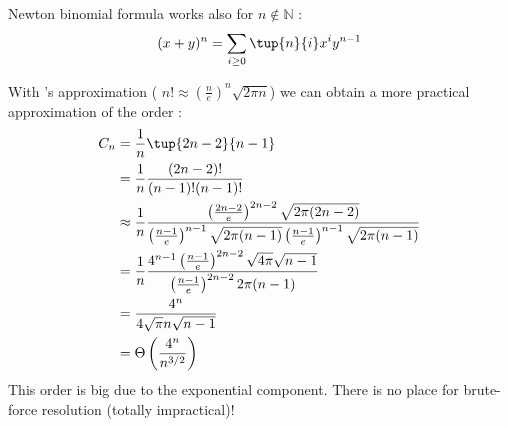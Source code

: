 \begin{theorem} \label{cm4:newton}
Newton binomial formula works also for $n\not\in \mathbb{N}$ : $$(x+y)^n = \sum_{i\geq 0} \tup{n}{i} x^i y^{n-1}$$
\end{theorem}

With 's approximation (
$n! \approx \left(\frac{n}{e}\right)^n \sqrt{2\pi n}$) we can obtain a more practical approximation of the order : 
\begin{align*}
C_n &= \frac{1}{n}\tup{2n-2}{n-1}\\
&= \frac{1}{n} \frac{(2n-2)!}{(n-1)!(n-1)!}\\
&\approx \frac{1}{n} \frac{\left(\frac{2n-2}{e}\right)^{2n-2} \sqrt{2\pi (2n-2)}}{\left(\frac{n-1}{e}\right)^{n-1} \sqrt{2\pi (n-1)}\left(\frac{n-1}{e}\right)^{n-1} \sqrt{2\pi (n-1)}}\\
&=\frac{1}{n} \frac{4^{n-1}\left(\frac{n-1}{e}\right)^{2n-2}\sqrt{4\pi}\sqrt{n-1}}{\left(\frac{n-1}{e}\right)^{2n-2}2\pi (n-1)}\\
&=\frac{4^n}{4\sqrt{\pi} n\sqrt{n-1}}\\
&= \Theta \left(\frac{4^n}{n^{3/2}}\right)
\end{align*}
This order is big due to the exponential component. There is no place for brute-force resolution (totally impractical)!
